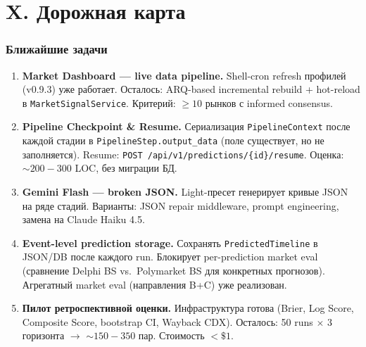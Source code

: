 \documentclass[a4paper, 11pt]{article}
\begin{document}
\newpage



\part*{X. Дорожная карта}

\section{Ближайшие задачи}

\begin{enumerate}
  \item \textbf{Market Dashboard --- live data pipeline.}
    Shell-cron refresh профилей (v0.9.3) уже работает.
    Осталось: ARQ-based incremental rebuild + hot-reload в \texttt{MarketSignalService}.
    Критерий: $\geq 10$ рынков с informed consensus.

  \item \textbf{Pipeline Checkpoint \& Resume.}
    Сериализация \texttt{PipelineContext} после каждой стадии
    в \texttt{PipelineStep.output\_data} (поле существует, но не заполняется).
    Resume: \texttt{POST /api/v1/predictions/\{id\}/resume}.
    Оценка: ${\sim}200{-}300$ LOC, без миграции БД.

  \item \textbf{Gemini Flash --- broken JSON.}
    Light-пресет генерирует кривые JSON на ряде стадий.
    Варианты: JSON repair middleware, prompt engineering,
    замена на Claude Haiku 4.5.

  \item \textbf{Event-level prediction storage.}
    Сохранять \texttt{PredictedTimeline} в JSON/DB после каждого run.
    Блокирует per-prediction market eval (сравнение Delphi BS vs.\ Polymarket BS для конкретных прогнозов).
    Агрегатный market eval (направления B+C) уже реализован.

  \item \textbf{Пилот ретроспективной оценки.}
    Инфраструктура готова (Brier, Log Score, Composite Score, bootstrap CI, Wayback CDX).
    Осталось: 50 runs $\times$ 3 горизонта $\to$ ${\sim}150{-}350$ пар.
    Стоимость $< \$1$.
\end{enumerate}
\end{document}

